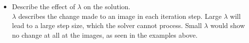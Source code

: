 \documentclass{paper}
\begin{document}
\begin{enumerate}

\begin{itemize}
\item Describe the effect of $\lambda$ on the solution. \\
      $\lambda$ describes the change made to an image in each iteration step. Large $\lambda$ will lead to a large step size, which the solver cannot process. Small $\lambda$ would show no change at all at the images, as seen in the examples above.

\end{itemize}


\end{enumerate}
\end{document}
